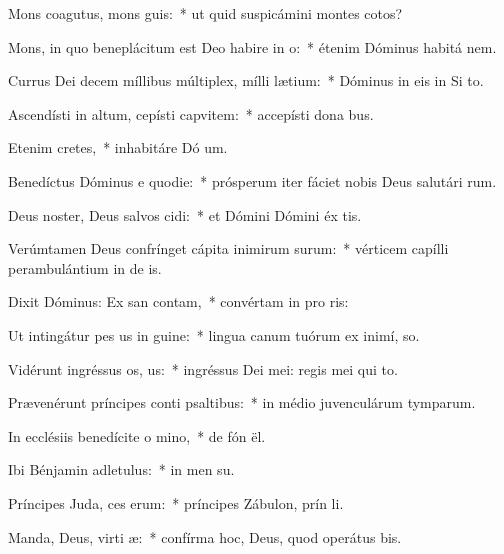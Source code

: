 \item Mons coagutus, mons guis:~* ut quid suspicámini montes cotos?
\item Mons, in quo beneplácitum est Deo habire in o:~* étenim Dóminus habitá  nem.
\item Currus Dei decem míllibus múltiplex, mílli lætium:~* Dóminus in eis in Si  to.
\item Ascendísti in altum, cepísti capvitem:~* accepísti dona  bus.
\item Etenim  cretes,~* inhabitáre Dó um.
\item Benedíctus Dóminus e quodie:~* prósperum iter fáciet nobis Deus salutári rum.
\item Deus noster, Deus salvos cidi:~* et Dómini Dómini éx tis.
\item Verúmtamen Deus confrínget cápita inimirum surum:~* vérticem capílli perambulántium in de is.
\item Dixit Dóminus: Ex san contam,~* convértam in pro ris:
\item Ut intingátur pes us in guine:~* lingua canum tuórum ex inimí,  so.
\item Vidérunt ingréssus os, us:~* ingréssus Dei mei: regis mei qui   to.
\item Prævenérunt príncipes conti psaltibus:~* in médio juvenculárum tymparum.
\item In ecclésiis benedícite o mino,~* de fón ël.
\item Ibi Bénjamin adletulus:~* in men su.
\item Príncipes Juda, ces erum:~* príncipes Zábulon, prín li.
\item Manda, Deus, virti æ:~* confírma hoc, Deus, quod operátus   bis.
